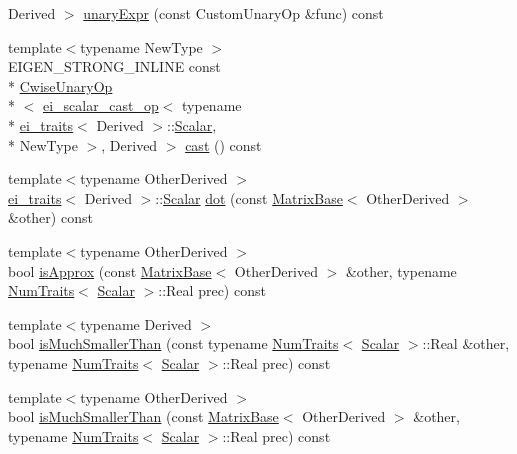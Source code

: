\begin{DoxyCompactItemize}
Derived $>$ \hyperlink{class_matrix_base_aa1fc7f2c6942cb3a7004839aa2f97153}{unary\-Expr} (const Custom\-Unary\-Op \&func) const 
\item 
{\footnotesize template$<$typename New\-Type $>$ }\\E\-I\-G\-E\-N\-\_\-\-S\-T\-R\-O\-N\-G\-\_\-\-I\-N\-L\-I\-N\-E const \\*
\hyperlink{class_cwise_unary_op}{Cwise\-Unary\-Op}\\*
$<$ \hyperlink{structei__scalar__cast__op}{ei\-\_\-scalar\-\_\-cast\-\_\-op}$<$ typename \\*
\hyperlink{structei__traits}{ei\-\_\-traits}$<$ Derived $>$\-::\hyperlink{class_matrix_base_a625df8339dc2d816cbc0fd66e7dadaf5}{Scalar}, \\*
New\-Type $>$, Derived $>$ \hyperlink{class_matrix_base_ab00ab9c7e975025685eaf314b50145b4}{cast} () const 
\item 
{\footnotesize template$<$typename Other\-Derived $>$ }\\\hyperlink{structei__traits}{ei\-\_\-traits}$<$ Derived $>$\-::\hyperlink{class_matrix_base_a625df8339dc2d816cbc0fd66e7dadaf5}{Scalar} \hyperlink{class_matrix_base_ab1572b032cb85977307dfafc008becd0}{dot} (const \hyperlink{class_matrix_base}{Matrix\-Base}$<$ Other\-Derived $>$ \&other) const 
\item 
{\footnotesize template$<$typename Other\-Derived $>$ }\\bool \hyperlink{class_matrix_base_abd1c692a0b627f24d0953bde1c4b4de5}{is\-Approx} (const \hyperlink{class_matrix_base}{Matrix\-Base}$<$ Other\-Derived $>$ \&other, typename \hyperlink{struct_num_traits}{Num\-Traits}$<$ \hyperlink{class_matrix_base_a625df8339dc2d816cbc0fd66e7dadaf5}{Scalar} $>$\-::Real prec) const 
\item 
{\footnotesize template$<$typename Derived $>$ }\\bool \hyperlink{class_matrix_base_a7d53f3d135942e8ac49f16b79a2441ba}{is\-Much\-Smaller\-Than} (const typename \hyperlink{struct_num_traits}{Num\-Traits}$<$ \hyperlink{class_matrix_base_a625df8339dc2d816cbc0fd66e7dadaf5}{Scalar} $>$\-::Real \&other, typename \hyperlink{struct_num_traits}{Num\-Traits}$<$ \hyperlink{class_matrix_base_a625df8339dc2d816cbc0fd66e7dadaf5}{Scalar} $>$\-::Real prec) const 
\item 
{\footnotesize template$<$typename Other\-Derived $>$ }\\bool \hyperlink{class_matrix_base_ad2aea728cefed421670bb330731b00c7}{is\-Much\-Smaller\-Than} (const \hyperlink{class_matrix_base}{Matrix\-Base}$<$ Other\-Derived $>$ \&other, typename \hyperlink{struct_num_traits}{Num\-Traits}$<$ \hyperlink{class_matrix_base_a625df8339dc2d816cbc0fd66e7dadaf5}{Scalar} $>$\-::Real prec) const 

\end{DoxyCompactItemize}
